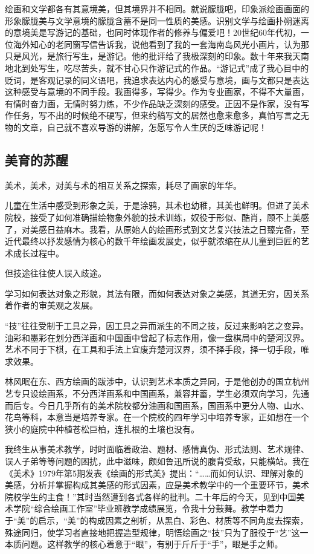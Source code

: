 \documentclass{article}
\begin{document}
绘画和文学都各有其意境美，但其境界并不相同。就说朦胧吧，印象派绘画画面的形象朦胧美与文学意境的朦胧含蓄不是同一性质的美感。识别文学与绘画扑朔迷离的意境美是写游记的基础，也同时体现作者的修养与偏爱吧！20世纪60年代初，一位海外知心的老同窗写信告诉我，说他看到了我的一套海南岛风光小画片，认为那只是风光，是旅行写生，是游记。他的批评给了我极深刻的印象。数十年来我天南地北到处写生，吃尽苦头，就不甘心只作游记式的作品。“游记式”成了我心目中的贬词，是客观记录的同义语吧，我追求表达内心的感受与意境，画与文都只是表达这种感受与意境的不同手段。我画得多，写得少。作为专业画家，不得不大量画，有情时奋力画，无情时努力练，不少作品缺乏深刻的感受。正因不是作家，没有写作任务，写不出的时候绝不硬写，但来约稿写文的居然也愈来愈多，真怕写言之无物的文章，自己就不喜欢导游的讲解，怎愿写令人生厌的乏味游记呢！
\subsection{美育的苏醒}
美术，美术，对美与术的相互关系之探索，耗尽了画家的年华。

儿童在生活中感受到形象之美，于是涂鸦，其术也幼稚，其美也鲜明。但进了美术院校，接受了如何准确描绘物象外貌的技术训练，奴役于形似、酷肖，顾不上美感了，对美感日益麻木。我看，从原始人的绘画形式到文艺复兴技法之日臻完备，至近代最终以抒发感情为核心的数千年绘画发展史，似乎就浓缩在从儿童到巨匠的艺术成长过程中。

但技途往往使人误入歧途。

学习如何表达对象之形貌，其法有限，而如何表达对象之美感，其道无穷，因关系着作者的审美观之发展。

“技”往往受制于工具之异，因工具之异而派生的不同之技，反过来影响艺之变异。油彩和墨彩在划分西洋画和中国画中曾起了标志作用，像一盘棋局中的楚河汉界。艺术不同于下棋，在工具和手法上宜废弃楚河汉界，须不择手段，择一切手段，唯求效果。

林风眠在东、西方绘画的跋涉中，认识到艺术本质之异同，于是他创办的国立杭州艺专只设绘画系，不分西洋画系和中国画系，兼容并蓄，学生必须双向学习，先通而后专。今日几乎所有的美术院校都分油画和国画系，国画系中更分人物、山水、花鸟等科，本意当是培养专家。在一个院校的四年学习中培养专家，正如想在一个狭小的庭院中种植苍松巨柏，连扎根的土壤也没有。

我终生从事美术教学，时时面临着政治、题材、感情真伪、形式法则、艺术规律、误人子弟等等问题的困扰，此中滋味，颇如鲁迅所说的腹背受敌，只能横站。我在《美术》1979年第5期发表《绘画的形式美》提出：“……而如何认识、理解对象的美感，分析并掌握构成其美感的形式因素，应是美术教学中的一个重要环节，美术院校学生的主食！”其时当然遭到各式各样的批判。二十年后的今天，见到中国美术学院“综合绘画工作室”毕业班教学成绩展览，令我十分鼓舞。教学中着力于“美”的启示，“美”的构成因素之剖析，从黑白、彩色、材质等不同角度去探索，殊途同归，使学习者直接地把握造型规律，明悟绘画之“技”只为了服役于“艺”这一本质问题。这样教学的核心着意于“眼”，有别于斤斤于“手”，眼是手之师。
\end{document}
